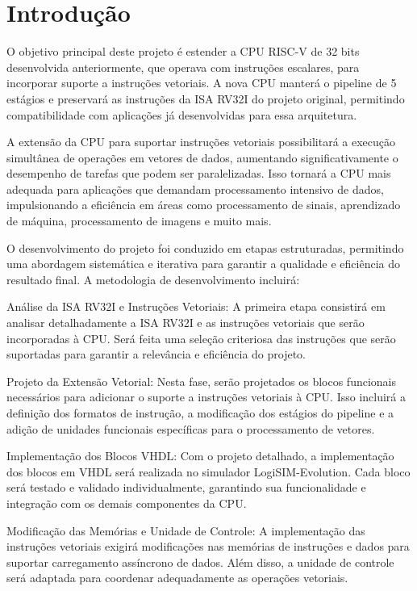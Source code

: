 \documentclass[12pt]{article}
\begin{document}
\section{Introdução}

O objetivo principal deste projeto é estender a CPU RISC-V de 32 bits desenvolvida anteriormente, que operava com instruções escalares, para incorporar suporte a instruções vetoriais. A nova CPU manterá o pipeline de 5 estágios e preservará as instruções da ISA RV32I do projeto original, permitindo compatibilidade com aplicações já desenvolvidas para essa arquitetura.

A extensão da CPU para suportar instruções vetoriais possibilitará a execução simultânea de operações em vetores de dados, aumentando significativamente o desempenho de tarefas que podem ser paralelizadas. Isso tornará a CPU mais adequada para aplicações que demandam processamento intensivo de dados, impulsionando a eficiência em áreas como processamento de sinais, aprendizado de máquina, processamento de imagens e muito mais.

O desenvolvimento do projeto foi conduzido em etapas estruturadas, permitindo uma abordagem sistemática e iterativa para garantir a qualidade e eficiência do resultado final. A metodologia de desenvolvimento incluirá:

Análise da ISA RV32I e Instruções Vetoriais: A primeira etapa consistirá em analisar detalhadamente a ISA RV32I e as instruções vetoriais que serão incorporadas à CPU. Será feita uma seleção criteriosa das instruções que serão suportadas para garantir a relevância e eficiência do projeto.

Projeto da Extensão Vetorial: Nesta fase, serão projetados os blocos funcionais necessários para adicionar o suporte a instruções vetoriais à CPU. Isso incluirá a definição dos formatos de instrução, a modificação dos estágios do pipeline e a adição de unidades funcionais específicas para o processamento de vetores.

Implementação dos Blocos VHDL: Com o projeto detalhado, a implementação dos blocos em VHDL será realizada no simulador LogiSIM-Evolution. Cada bloco será testado e validado individualmente, garantindo sua funcionalidade e integração com os demais componentes da CPU.

Modificação das Memórias e Unidade de Controle: A implementação das instruções vetoriais exigirá modificações nas memórias de instruções e dados para suportar carregamento assíncrono de dados. Além disso, a unidade de controle será adaptada para coordenar adequadamente as operações vetoriais.
\end{document}
